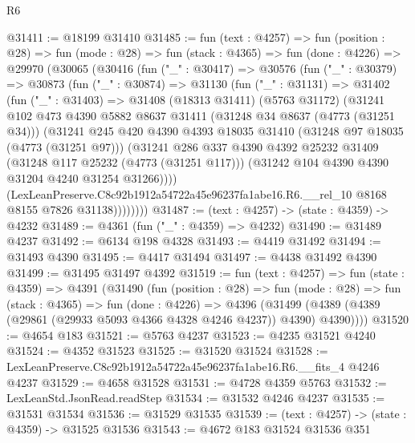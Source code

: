 \begin{lexlean}{R6}
\begin{coremodule}
@31411 := @18199 @31410
@31485 := fun (text : @4257) =>
  fun (position : @28) =>
  fun (mode : @28) =>
  fun (stack : @4365) =>
  fun (done : @4226) =>
  @29970
    (@30065
      (@30416
        (fun ("_" : @30417) =>
        @30576
          (fun ("_" : @30379) =>
          @30873
            (fun ("_" : @30874) =>
            @31130
              (fun ("_" : @31131) =>
              @31402
                (fun ("_" : @31403) =>
                @31408
                  (@18313 @31411)
                  (@5763 @31172)
                  (@31241
                    @102
                    @473
                    @4390
                    @5882
                    @8637
                    @31411
                    (@31248 @34 @8637 (@4773 (@31251 @34)))
                    (@31241
                      @245
                      @420
                      @4390
                      @4393
                      @18035
                      @31410
                      (@31248 @97 @18035 (@4773 (@31251 @97)))
                      (@31241
                        @286
                        @337
                        @4390
                        @4392
                        @25232
                        @31409
                        (@31248 @117 @25232 (@4773 (@31251 @117)))
                        (@31242 @104 @4390 @4390 @31204 @4240 @31254 @31266))))
                  (LexLeanPreserve.C8c92b1912a54722a45e96237fa1abe16.R6.__rel_10
                    @8168
                    @8155
                    @7826
                    @31138))))))))
@31487 := (text : @4257) -> (state : @4359) -> @4232
@31489 := @4361 (fun ("_" : @4359) => @4232)
@31490 := @31489 @4237
@31492 := @6134 @198 @4328
@31493 := @4419 @31492
@31494 := @31493 @4390
@31495 := @4417 @31494
@31497 := @4438 @31492 @4390
@31499 := @31495 @31497 @4392
@31519 := fun (text : @4257) =>
  fun (state : @4359) =>
  @4391
    (@31490
      (fun (position : @28) =>
      fun (mode : @28) =>
      fun (stack : @4365) =>
      fun (done : @4226) =>
      @4396 (@31499 (@4389 (@4389 (@29861 (@29933 @5093 @4366 @4328 @4246 @4237)) @4390) @4390))))
@31520 := @4654 @183
@31521 := @5763 @4237
@31523 := @4235 @31521 @4240
@31524 := @4352 @31523
@31525 := @31520 @31524
@31528 := LexLeanPreserve.C8c92b1912a54722a45e96237fa1abe16.R6.__fits_4 @4246 @4237
@31529 := @4658 @31528
@31531 := @4728 @4359 @5763
@31532 := LexLeanStd.JsonRead.readStep
@31534 := @31532 @4246 @4237
@31535 := @31531 @31534
@31536 := @31529 @31535
@31539 := (text : @4257) -> (state : @4359) -> @31525 @31536
@31543 := @4672 @183 @31524 @31536 @351

\end{coremodule}
\end{lexlean}
